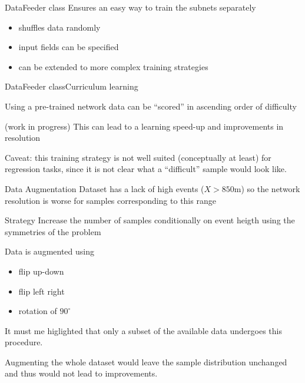 \documentclass{beamer}
\begin{document}
\begin{frame}{DataFeeder class}
    Ensures an easy way to train the subnets separately

    \begin{itemize}
        \item shuffles data randomly
        \item input fields can be specified
        \item can be extended to more complex training strategies
    \end{itemize}
    
\end{frame}

\begin{frame}{DataFeeder class}{Curriculum learning}

    Using a pre-trained network data can be ``scored'' in ascending order of difficulty

    (work in progress) This can lead to a learning speed-up and improvements in resolution
    
    Caveat: this training strategy is not well suited (conceptually at least) for regression tasks, 
    since it is not clear what a ``difficult'' sample would look like.
\end{frame}

\begin{frame}{Data Augmentation}
    Dataset has a lack of high events ($X > 850$m) so the network resolution is worse
    for samples corresponding to this range

    \begin{block}{Strategy}
        Increase the number of samples conditionally on event heigth using the
        symmetries of the problem
    \end{block}

    Data is augmented using
    \begin{itemize}
        \item flip up-down
        \item flip left right
        \item rotation of $90^{\circ}$
    \end{itemize}
    
    It must me higlighted that only a subset of the available data undergoes this procedure.

    Augmenting the whole dataset would leave the sample distribution unchanged and thus would not lead 
    to improvements.
\end{frame}
\end{document}
